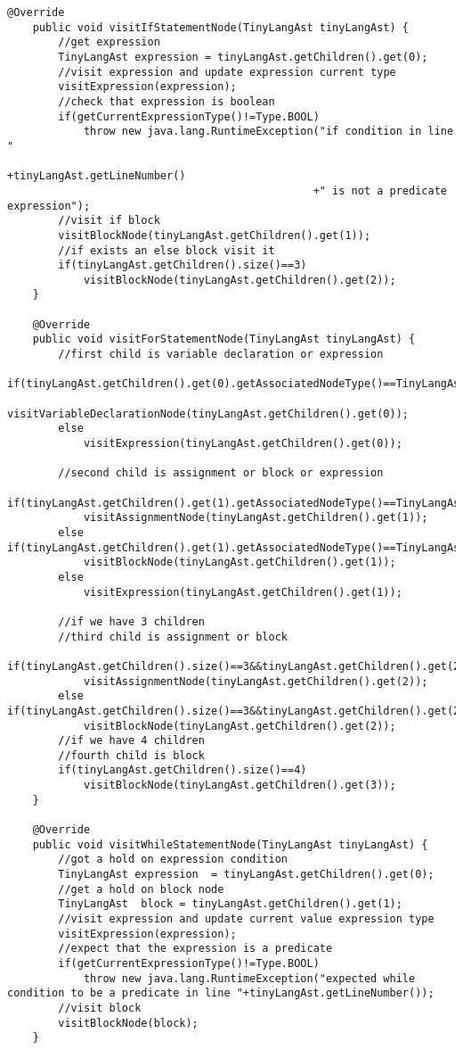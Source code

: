 \begin{lstlisting}[basicstyle=\miniscule,caption=Semantic Analyser,label=listing:semanticanalyser]
	@Override
	public void visitIfStatementNode(TinyLangAst tinyLangAst) {
		//get expression
		TinyLangAst expression = tinyLangAst.getChildren().get(0);
		//visit expression and update expression current type
		visitExpression(expression);
		//check that expression is boolean
		if(getCurrentExpressionType()!=Type.BOOL)
			throw new java.lang.RuntimeException("if condition in line "
												+tinyLangAst.getLineNumber()
												+" is not a predicate expression");
		//visit if block 
		visitBlockNode(tinyLangAst.getChildren().get(1));
		//if exists an else block visit it
		if(tinyLangAst.getChildren().size()==3)
			visitBlockNode(tinyLangAst.getChildren().get(2));
	}

	@Override
	public void visitForStatementNode(TinyLangAst tinyLangAst) {
		//first child is variable declaration or expression
		if(tinyLangAst.getChildren().get(0).getAssociatedNodeType()==TinyLangAstNodes.AST_VARIABLE_DECLARATION_NODE)
			visitVariableDeclarationNode(tinyLangAst.getChildren().get(0));
		else
			visitExpression(tinyLangAst.getChildren().get(0));
		
		//second child is assignment or block or expression
		if(tinyLangAst.getChildren().get(1).getAssociatedNodeType()==TinyLangAstNodes.AST_ASSIGNMENT_NODE)
			visitAssignmentNode(tinyLangAst.getChildren().get(1));
		else if(tinyLangAst.getChildren().get(1).getAssociatedNodeType()==TinyLangAstNodes.AST_BLOCK_NODE)
			visitBlockNode(tinyLangAst.getChildren().get(1)); 
		else
			visitExpression(tinyLangAst.getChildren().get(1));
		
		//if we have 3 children
		//third child is assignment or block
		if(tinyLangAst.getChildren().size()==3&&tinyLangAst.getChildren().get(2).getAssociatedNodeType()==TinyLangAstNodes.AST_ASSIGNMENT_NODE)
			visitAssignmentNode(tinyLangAst.getChildren().get(2));
		else if(tinyLangAst.getChildren().size()==3&&tinyLangAst.getChildren().get(2).getAssociatedNodeType()==TinyLangAstNodes.AST_BLOCK_NODE)
			visitBlockNode(tinyLangAst.getChildren().get(2));
		//if we have 4 children 
		//fourth child is block
		if(tinyLangAst.getChildren().size()==4)
			visitBlockNode(tinyLangAst.getChildren().get(3));
	}

	@Override
	public void visitWhileStatementNode(TinyLangAst tinyLangAst) {
		//got a hold on expression condition
		TinyLangAst expression  = tinyLangAst.getChildren().get(0);
		//get a hold on block node
		TinyLangAst	 block = tinyLangAst.getChildren().get(1);
		//visit expression and update current value expression type 
		visitExpression(expression);
		//expect that the expression is a predicate
		if(getCurrentExpressionType()!=Type.BOOL)
			throw new java.lang.RuntimeException("expected while condition to be a predicate in line "+tinyLangAst.getLineNumber());
		//visit block
		visitBlockNode(block);
	}


\end{lstlisting}
